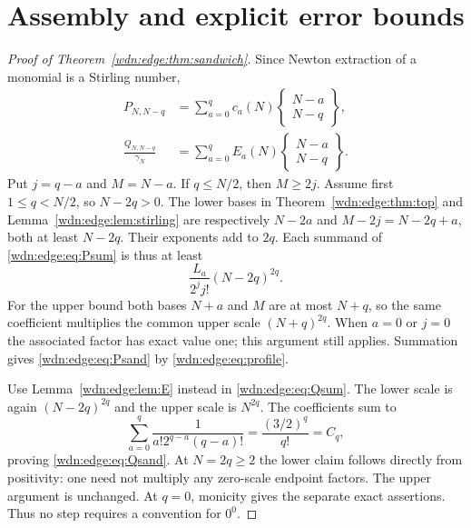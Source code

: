 \documentclass[11pt,letterpaper]{article}
\theoremstyle{remark}\newtheorem{remark}[theorem]{Remark}
\newcommand{\stir}[2]{\left\{\begin{matrix}#1\\#2\end{matrix}\right\}}
\begin{document}
\section{Assembly and explicit error bounds}\label{wdn:edge:sec:assembly}
\begin{proof}[Proof of Theorem~\ref{wdn:edge:thm:sandwich}]
Since Newton extraction of a monomial is a Stirling number,
\begin{align}
 P_{N,N-q}&=\sum_{a=0}^{q}c_a(N)\stir{N-a}{N-q},\label{wdn:edge:eq:Psum}\\
 \frac{Q_{N,N-q}}{\gamma_N}
 &=\sum_{a=0}^{q}E_a(N)\stir{N-a}{N-q}.\label{wdn:edge:eq:Qsum}
\end{align}
Put $j=q-a$ and $M=N-a$. If $q\le N/2$, then $M\ge2j$.
Assume first $1\le q<N/2$, so $N-2q>0$.
The lower bases in Theorem~\ref{wdn:edge:thm:top} and
Lemma~\ref{wdn:edge:lem:stirling} are respectively $N-2a$ and
$M-2j=N-2q+a$, both at least $N-2q$. Their exponents add to $2q$.
Each summand of \eqref{wdn:edge:eq:Psum} is thus at least
\[
 \frac{L_a}{2^j j!}(N-2q)^{2q}.
\]
For the upper bound both bases $N+a$ and $M$ are at most $N+q$,
so the same coefficient multiplies the common upper scale $(N+q)^{2q}$.
When $a=0$ or $j=0$ the associated factor has exact value one; this
argument still applies. Summation gives \eqref{wdn:edge:eq:Psand} by
\eqref{wdn:edge:eq:profile}.

Use Lemma~\ref{wdn:edge:lem:E} instead in \eqref{wdn:edge:eq:Qsum}. The lower scale is
again $(N-2q)^{2q}$ and the upper scale is $N^{2q}$. The coefficients sum to
\[
 \sum_{a=0}^{q}\frac1{a!2^{q-a}(q-a)!}
 =\frac{(3/2)^q}{q!}=C_q,
\]
proving \eqref{wdn:edge:eq:Qsand}. At $N=2q\ge2$ the lower claim follows directly
from positivity: one need not multiply any zero-scale endpoint factors.
The upper argument is unchanged. At $q=0$, monicity gives the separate
exact assertions. Thus no step requires a convention for $0^0$.
\end{proof}
\end{document}

